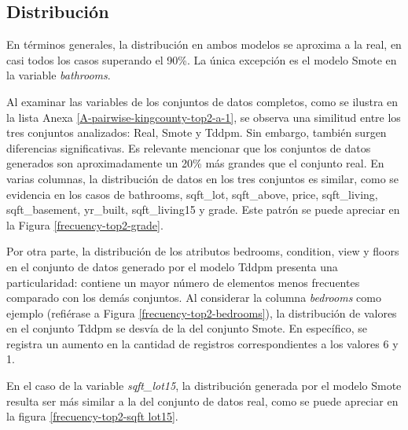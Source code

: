 
\newpage
\subsection{Distribución}
En términos generales, la distribución en ambos modelos se aproxima a la real, en casi todos los casos superando el 90\%. La única excepción es el modelo Smote en la variable \emph{bathrooms}.


\newpage
Al examinar las variables de los conjuntos de datos completos, como se ilustra en la lista Anexa \ref{A-pairwise-kingcounty-top2-a-1}, se observa una similitud entre los tres conjuntos analizados: Real, Smote y Tddpm. Sin embargo, también surgen diferencias significativas. Es relevante mencionar que los conjuntos de datos generados son aproximadamente un 20\% más grandes que el conjunto real. En varias columnas, la distribución de datos en los tres conjuntos es similar, como se evidencia en los casos de bathrooms, sqft\_lot, sqft\_above, price, sqft\_living, sqft\_basement, yr\_built, sqft\_living15 y grade. Este patrón se puede apreciar en la Figura \ref{frecuency-top2-grade}.



\newpage
Por otra parte, la distribución de los atributos bedrooms, condition, view y floors en el conjunto de datos generado por el modelo Tddpm presenta una particularidad: contiene un mayor número de elementos menos frecuentes comparado con los demás conjuntos. Al considerar la columna \emph{bedrooms} como ejemplo (refiérase a Figura \ref{frecuency-top2-bedrooms}), la distribución de valores en el conjunto Tddpm se desvía de la del conjunto Smote. En específico, se registra un aumento en la cantidad de registros correspondientes a los valores 6 y 1.



\newpage
En el caso de la variable \emph{sqft\_lot15}, la distribución generada por el modelo Smote resulta ser más similar a la del conjunto de datos real, como se puede apreciar en la figura \ref{frecuency-top2-sqft lot15}.


\newpage
